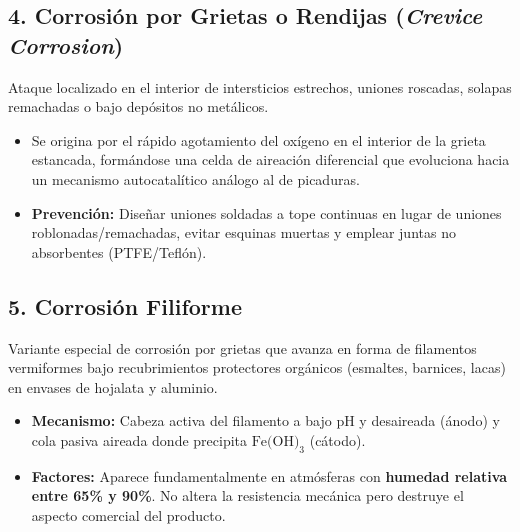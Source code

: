 \subsection{4. Corrosión por Grietas o Rendijas (\textit{Crevice Corrosion})}
Ataque localizado en el interior de intersticios estrechos, uniones roscadas, solapas remachadas o bajo depósitos no metálicos.
\begin{itemize}
    \item Se origina por el rápido agotamiento del oxígeno en el interior de la grieta estancada, formándose una celda de aireación diferencial que evoluciona hacia un mecanismo autocatalítico análogo al de picaduras.
    \item \textbf{Prevención:} Diseñar uniones soldadas a tope continuas en lugar de uniones roblonadas/remachadas, evitar esquinas muertas y emplear juntas no absorbentes (PTFE/Teflón).
\end{itemize}

\subsection{5. Corrosión Filiforme}
Variante especial de corrosión por grietas que avanza en forma de filamentos vermiformes bajo recubrimientos protectores orgánicos (esmaltes, barnices, lacas) en envases de hojalata y aluminio.
\begin{itemize}
    \item \textbf{Mecanismo:} Cabeza activa del filamento a bajo $\text{pH}$ y desaireada (ánodo) y cola pasiva aireada donde precipita $\text{Fe(OH)}_3$ (cátodo).
    \item \textbf{Factores:} Aparece fundamentalmente en atmósferas con \textbf{humedad relativa entre 65\% y 90\%}. No altera la resistencia mecánica pero destruye el aspecto comercial del producto.
\end{itemize}

